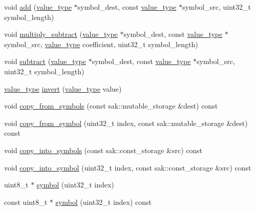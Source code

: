 \begin{DoxyCompactItemize}
\item 
void \hyperlink{group__finite__field__api_ga322b46d6ee16c2d917a088efddb3d2ce}{add} (\hyperlink{classlayer_a3ad6d6930927932e5c25f2a2b5277cc0}{value\-\_\-type} $\ast$symbol\-\_\-dest, const \hyperlink{classlayer_a3ad6d6930927932e5c25f2a2b5277cc0}{value\-\_\-type} $\ast$symbol\-\_\-src, uint32\-\_\-t symbol\-\_\-length)
\item 
void \hyperlink{group__finite__field__api_ga1ab2906c47cd688c687d4a59ff26f1f3}{multiply\-\_\-subtract} (\hyperlink{classlayer_a3ad6d6930927932e5c25f2a2b5277cc0}{value\-\_\-type} $\ast$symbol\-\_\-dest, const \hyperlink{classlayer_a3ad6d6930927932e5c25f2a2b5277cc0}{value\-\_\-type} $\ast$symbol\-\_\-src, \hyperlink{classlayer_a3ad6d6930927932e5c25f2a2b5277cc0}{value\-\_\-type} coefficient, uint32\-\_\-t symbol\-\_\-length)
\item 
void \hyperlink{group__finite__field__api_ga0e7473c28cc2db06dc6849297483ad07}{subtract} (\hyperlink{classlayer_a3ad6d6930927932e5c25f2a2b5277cc0}{value\-\_\-type} $\ast$symbol\-\_\-dest, const \hyperlink{classlayer_a3ad6d6930927932e5c25f2a2b5277cc0}{value\-\_\-type} $\ast$symbol\-\_\-src, uint32\-\_\-t symbol\-\_\-length)
\item 
\hyperlink{classlayer_a3ad6d6930927932e5c25f2a2b5277cc0}{value\-\_\-type} \hyperlink{group__finite__field__api_ga4654e057e36b9ae5c97528a2f146f918}{invert} (\hyperlink{classlayer_a3ad6d6930927932e5c25f2a2b5277cc0}{value\-\_\-type} value)
\item 
void \hyperlink{group__storage__api_ga7b7161e58ad9cc64c1cf010ef517f847}{copy\-\_\-from\-\_\-symbols} (const sak\-::mutable\-\_\-storage \&dest) const 
\item 
void \hyperlink{group__storage__api_ga6121237db4e314475b0f358c21b6dbb5}{copy\-\_\-from\-\_\-symbol} (uint32\-\_\-t index, const sak\-::mutable\-\_\-storage \&dest) const 
\item 
void \hyperlink{group__storage__api_gad72ab5996a9a27ea93a57b16da66a21d}{copy\-\_\-into\-\_\-symbols} (const sak\-::const\-\_\-storage \&src) const 
\item 
void \hyperlink{group__storage__api_gabef8acaba64c240184b1c59ba1cdfab8}{copy\-\_\-into\-\_\-symbol} (uint32\-\_\-t index, const sak\-::const\-\_\-storage \&src) const 
\item 
uint8\-\_\-t $\ast$ \hyperlink{group__storage__api_ga576eb5065641dfac94253dbd74b50c99}{symbol} (uint32\-\_\-t index)
\item 
const uint8\-\_\-t $\ast$ \hyperlink{group__storage__api_ga6982431f8ad42387ac7310f673ccfd5b}{symbol} (uint32\-\_\-t index) const 

\end{DoxyCompactItemize}

